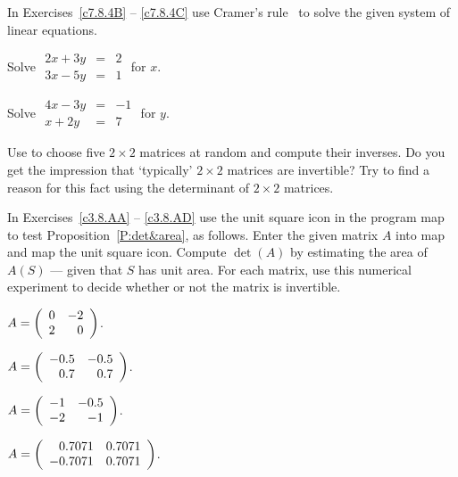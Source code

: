 \documentclass{ximera}
\begin{document}
\noindent In Exercises~\ref{c7.8.4B} -- \ref{c7.8.4C} use Cramer's 
rule~ to solve the given system of linear 
equations.
\begin{exercise} \label{c7.8.4B}
Solve \qquad $\begin{array}{rcl} 2x+3y & = & 2 \\ 3x - 5y & = & 1 \end{array}$ 
\qquad for $x$.
\end{exercise} 
\begin{exercise} \label{c7.8.4C}
Solve \qquad
$\begin{array}{rcl} 4x-3y & = & -1 \\ x + 2y & = & 7 \end{array}$ 
\qquad for $y$.
\end{exercise}

\CEXER

\begin{exercise} \label{c4.9.9}
Use \Matlab to choose five $2\times 2$ matrices at random and compute
their inverses.  Do you get the impression that `typically'
$2\times 2$ matrices are invertible?  Try to find a reason for
this fact using the determinant of $2\times 2$ matrices.
\end{exercise}

\noindent  In Exercises~\ref{c3.8.AA} -- \ref{c3.8.AD} use the {\sf unit 
square} icon in the program {\sf map} to test Proposition~\ref{P:det&area}, as 
follows. Enter the given matrix $A$ into {\sf map} and map the {\sf unit 
square} icon.  Compute $\det(A)$ by estimating the area of $A(S)$ --- given 
that $S$ has unit area.  For each matrix, use this numerical experiment to 
decide whether or not the matrix is invertible.
\begin{exercise}  \label{c3.8.AA}
$A=\left(\begin{array}{rr} 0 & -2\\ 2 &0\end{array}\right)$.
\end{exercise}
\begin{exercise}  \label{c3.8.AB}
$A=\left(\begin{array}{rr} -0.5 & -0.5\\ 0.7 &0.7\end{array}\right)$.
\end{exercise}
\begin{exercise}  \label{c3.8.AC}
$A=\left(\begin{array}{rr} -1 & -0.5\\ -2 &-1\end{array}\right)$.
\end{exercise}
\begin{exercise}  \label{c3.8.AD}
$A=\left(\begin{array}{rr} 0.7071 & 0.7071\\ -0.7071 &0.7071\end{array}\right)$.
\end{exercise}
\end{document}

